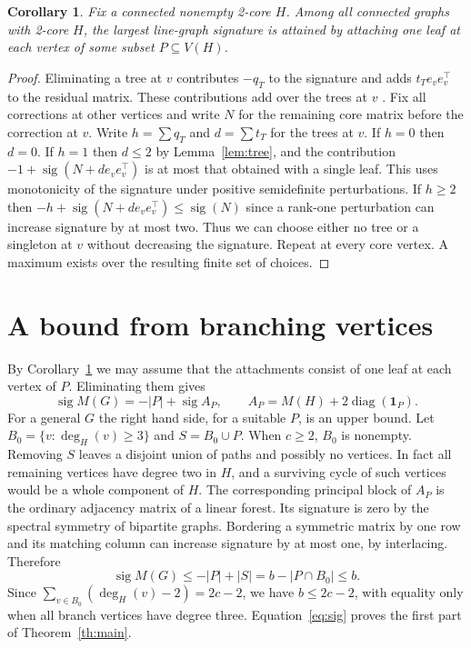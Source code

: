 \documentclass[11pt]{article}
\newtheorem{corollary}[theorem]{Corollary}
\newcommand{\sg}{\operatorname{sig}}
\newcommand{\diag}{\operatorname{diag}}
\begin{document}
\begin{corollary}\label{cor:leaves}
Fix a connected nonempty 2-core $H$. Among all connected graphs with 2-core $H$, the largest line-graph signature is attained by attaching one leaf at each vertex of some subset $P\subseteq V(H)$.
\end{corollary}
\begin{proof}
Eliminating a tree at $v$ contributes $-q_T$ to the signature and adds $t_Te_ve_v^\top$ to the residual matrix. These contributions add over the trees at $v$ \cite[Proposition 3.6]{pp}. Fix all corrections at other vertices and write $N$ for the remaining core matrix before the correction at $v$. Write $h=\sum q_T$ and $d=\sum t_T$ for the trees at $v$. If $h=0$ then $d=0$. If $h=1$ then $d\le2$ by Lemma~\ref{lem:tree}, and the contribution $-1+\sg(N+de_ve_v^\top)$ is at most that obtained with a single leaf. This uses monotonicity of the signature under positive semidefinite perturbations. If $h\ge2$ then $-h+\sg(N+de_ve_v^\top)\le\sg(N)$ since a rank-one perturbation can increase signature by at most two. Thus we can choose either no tree or a singleton at $v$ without decreasing the signature. Repeat at every core vertex. A maximum exists over the resulting finite set of choices.
\end{proof}

\section{A bound from branching vertices}
By Corollary~\ref{cor:leaves} we may assume that the attachments consist of one leaf at each vertex of $P$. Eliminating them gives
\begin{equation}\label{eq:paid}
 \sg M(G)=-|P|+\sg A_P,\qquad A_P=M(H)+2\diag(\mathbf1_P).
\end{equation}
For a general $G$ the right hand side, for a suitable $P$, is an upper bound. Let $B_0=\{v:\deg_H(v)\ge3\}$ and $S=B_0\cup P$. When $c\ge2$, $B_0$ is nonempty. Removing $S$ leaves a disjoint union of paths and possibly no vertices. In fact all remaining vertices have degree two in $H$, and a surviving cycle of such vertices would be a whole component of $H$. The corresponding principal block of $A_P$ is the ordinary adjacency matrix of a linear forest. Its signature is zero by the spectral symmetry of bipartite graphs. Bordering a symmetric matrix by one row and its matching column can increase signature by at most one, by interlacing. Therefore
\[
 \sg M(G)\le-|P|+|S|= b-|P\cap B_0|\le b.
\]
Since $\sum_{v\in B_0}(\deg_H(v)-2)=2c-2$, we have $b\le2c-2$, with equality only when all branch vertices have degree three. Equation~\eqref{eq:sig} proves the first part of Theorem~\ref{th:main}.
\end{document}
